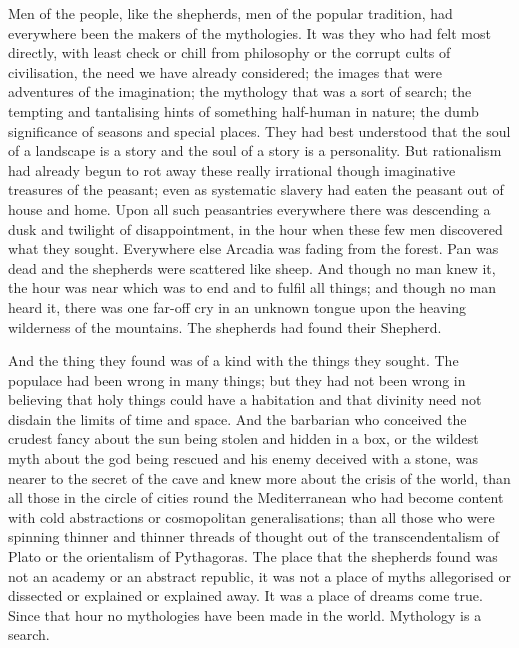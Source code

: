 Men of the people, like the shepherds, men of the popular tradition, had everywhere been the makers of the mythologies. It was they who had felt most directly, with least check or chill from philosophy or the corrupt cults of civilisation, the need we have already considered; the images that were adventures of the imagination; the mythology that was a sort of search; the tempting and tantalising hints of something half-human in nature; the dumb significance of seasons and special places. They had best understood that the soul of a landscape is a story and the soul of a story is a personality. But rationalism had already begun to rot away these really irrational though imaginative treasures of the peasant; even as systematic slavery had eaten the peasant out of house and home. Upon all such peasantries everywhere there was descending a dusk and twilight of disappointment, in the hour when these few men discovered what they sought. Everywhere else Arcadia was fading from the forest. Pan was dead and the shepherds were scattered like sheep. And though no man knew it, the hour was near which was to end and to fulfil all things; and though no man heard it, there was one far-off cry in an unknown tongue upon the heaving wilderness of the mountains. The shepherds had found their Shepherd.

And the thing they found was of a kind with the things they sought. The populace had been wrong in many things; but they had not been wrong in believing that holy things could have a habitation and that divinity need not disdain the limits of time and space. And the barbarian who conceived the crudest fancy about the sun being stolen and hidden in a box, or the wildest myth about the god being rescued and his enemy deceived with a stone, was nearer to the secret of the cave and knew more about the crisis of the world, than all those in the circle of cities round the Mediterranean who had become content with cold abstractions or cosmopolitan generalisations; than all those who were spinning thinner and thinner threads of thought out of the transcendentalism of Plato or the orientalism of Pythagoras. The place that the shepherds found was not an academy or an abstract republic, it was not a place of myths allegorised or dissected or explained or explained away. It was a place of dreams come true. Since that hour no mythologies have been made in the world. Mythology is a search.

